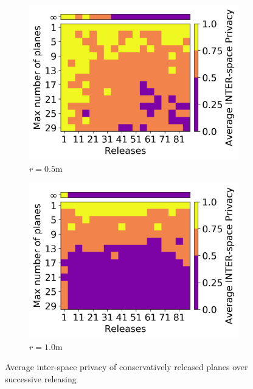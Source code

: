 \begin{figure}[t]
	\vspace{-2mm}
    \begin{subfigure}{0.49\columnwidth}
		\centering
		\includegraphics[width=\columnwidth]{figures/successive-varying-planes-heatmap-quantized-r05-3.png}
		\vspace{-5mm}
        \caption{$r = 0.5$m}
		\label{fig:varying-planes-heatmap}
	\end{subfigure}
    \begin{subfigure}[]{0.49\columnwidth}
		\centering
		\includegraphics[width=\columnwidth]{figures/successive-varying-planes-heatmap-quantized-r10-3.png}
		\vspace{-5mm}
		\caption{$r = 1.0$m}
		\label{fig:varying-planes-heatmap-r1}
	\end{subfigure}
	\caption{Average inter-space privacy of conservatively released planes over successive releasing}
	\label{fig:conservative-releasing-inter}
	\vspace{-3mm}
\end{figure}

